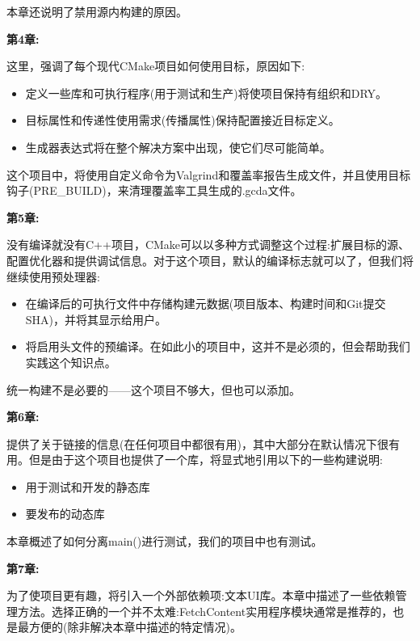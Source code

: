 本章还说明了禁用源内构建的原因。

\textbf{第4章:}

这里，强调了每个现代CMake项目如何使用目标，原因如下:

\begin{itemize}
\item 
定义一些库和可执行程序(用于测试和生产)将使项目保持有组织和DRY。

\item 
目标属性和传递性使用需求(传播属性)保持配置接近目标定义。

\item 
生成器表达式将在整个解决方案中出现，使它们尽可能简单。
\end{itemize}

这个项目中，将使用自定义命令为Valgrind和覆盖率报告生成文件，并且使用目标钩子(PRE\_BUILD)，来清理覆盖率工具生成的.gcda文件。

\textbf{第5章:}

没有编译就没有C++项目，CMake可以以多种方式调整这个过程:扩展目标的源、配置优化器和提供调试信息。对于这个项目，默认的编译标志就可以了，但我们将继续使用预处理器:

\begin{itemize}
\item 
在编译后的可执行文件中存储构建元数据(项目版本、构建时间和Git提交SHA)，并将其显示给用户。
	
\item 
将启用头文件的预编译。在如此小的项目中，这并不是必须的，但会帮助我们实践这个知识点。
\end{itemize}

统一构建不是必要的——这个项目不够大，但也可以添加。

\textbf{第6章:}

提供了关于链接的信息(在任何项目中都很有用)，其中大部分在默认情况下很有用。但是由于这个项目也提供了一个库，将显式地引用以下的一些构建说明:

\begin{itemize}
\item 
用于测试和开发的静态库

\item 
要发布的动态库
\end{itemize}

本章概述了如何分离main()进行测试，我们的项目中也有测试。

\textbf{第7章:}

为了使项目更有趣，将引入一个外部依赖项:文本UI库。本章中描述了一些依赖管理方法。选择正确的一个并不太难:FetchContent实用程序模块通常是推荐的，也是最方便的(除非解决本章中描述的特定情况)。

